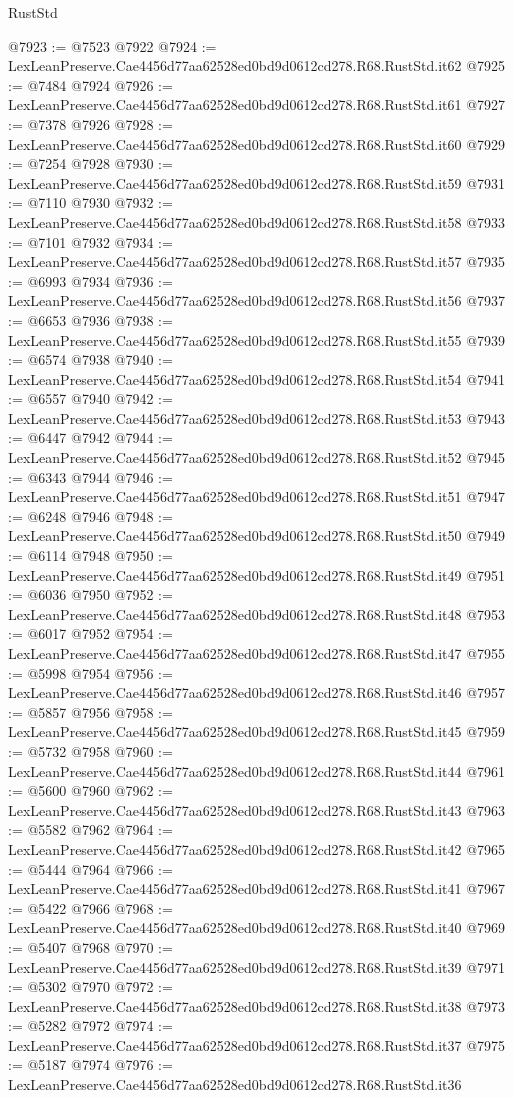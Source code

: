 \begin{lexlean}{RustStd}
\begin{coremodule}
@7923 := @7523 @7922
@7924 := LexLeanPreserve.Cae4456d77aa62528ed0bd9d0612cd278.R68.RustStd.it62
@7925 := @7484 @7924
@7926 := LexLeanPreserve.Cae4456d77aa62528ed0bd9d0612cd278.R68.RustStd.it61
@7927 := @7378 @7926
@7928 := LexLeanPreserve.Cae4456d77aa62528ed0bd9d0612cd278.R68.RustStd.it60
@7929 := @7254 @7928
@7930 := LexLeanPreserve.Cae4456d77aa62528ed0bd9d0612cd278.R68.RustStd.it59
@7931 := @7110 @7930
@7932 := LexLeanPreserve.Cae4456d77aa62528ed0bd9d0612cd278.R68.RustStd.it58
@7933 := @7101 @7932
@7934 := LexLeanPreserve.Cae4456d77aa62528ed0bd9d0612cd278.R68.RustStd.it57
@7935 := @6993 @7934
@7936 := LexLeanPreserve.Cae4456d77aa62528ed0bd9d0612cd278.R68.RustStd.it56
@7937 := @6653 @7936
@7938 := LexLeanPreserve.Cae4456d77aa62528ed0bd9d0612cd278.R68.RustStd.it55
@7939 := @6574 @7938
@7940 := LexLeanPreserve.Cae4456d77aa62528ed0bd9d0612cd278.R68.RustStd.it54
@7941 := @6557 @7940
@7942 := LexLeanPreserve.Cae4456d77aa62528ed0bd9d0612cd278.R68.RustStd.it53
@7943 := @6447 @7942
@7944 := LexLeanPreserve.Cae4456d77aa62528ed0bd9d0612cd278.R68.RustStd.it52
@7945 := @6343 @7944
@7946 := LexLeanPreserve.Cae4456d77aa62528ed0bd9d0612cd278.R68.RustStd.it51
@7947 := @6248 @7946
@7948 := LexLeanPreserve.Cae4456d77aa62528ed0bd9d0612cd278.R68.RustStd.it50
@7949 := @6114 @7948
@7950 := LexLeanPreserve.Cae4456d77aa62528ed0bd9d0612cd278.R68.RustStd.it49
@7951 := @6036 @7950
@7952 := LexLeanPreserve.Cae4456d77aa62528ed0bd9d0612cd278.R68.RustStd.it48
@7953 := @6017 @7952
@7954 := LexLeanPreserve.Cae4456d77aa62528ed0bd9d0612cd278.R68.RustStd.it47
@7955 := @5998 @7954
@7956 := LexLeanPreserve.Cae4456d77aa62528ed0bd9d0612cd278.R68.RustStd.it46
@7957 := @5857 @7956
@7958 := LexLeanPreserve.Cae4456d77aa62528ed0bd9d0612cd278.R68.RustStd.it45
@7959 := @5732 @7958
@7960 := LexLeanPreserve.Cae4456d77aa62528ed0bd9d0612cd278.R68.RustStd.it44
@7961 := @5600 @7960
@7962 := LexLeanPreserve.Cae4456d77aa62528ed0bd9d0612cd278.R68.RustStd.it43
@7963 := @5582 @7962
@7964 := LexLeanPreserve.Cae4456d77aa62528ed0bd9d0612cd278.R68.RustStd.it42
@7965 := @5444 @7964
@7966 := LexLeanPreserve.Cae4456d77aa62528ed0bd9d0612cd278.R68.RustStd.it41
@7967 := @5422 @7966
@7968 := LexLeanPreserve.Cae4456d77aa62528ed0bd9d0612cd278.R68.RustStd.it40
@7969 := @5407 @7968
@7970 := LexLeanPreserve.Cae4456d77aa62528ed0bd9d0612cd278.R68.RustStd.it39
@7971 := @5302 @7970
@7972 := LexLeanPreserve.Cae4456d77aa62528ed0bd9d0612cd278.R68.RustStd.it38
@7973 := @5282 @7972
@7974 := LexLeanPreserve.Cae4456d77aa62528ed0bd9d0612cd278.R68.RustStd.it37
@7975 := @5187 @7974
@7976 := LexLeanPreserve.Cae4456d77aa62528ed0bd9d0612cd278.R68.RustStd.it36

\end{coremodule}
\end{lexlean}
